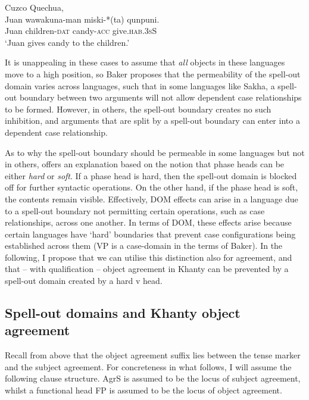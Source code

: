 \documentclass[output=paper
,modfonts
,nonflat]{langsci/langscibook}
\begin{document}
\begin{exe}
\ex Cuzco Quechua, \citet[][146]{Baker2015}\\
\gll Juan wawakuna-man miski-*(ta) qunpuni.\\
Juan children-\textsc{dat} candy-\textsc{acc} give.\textsc{hab.3sS}\\
\glt `Juan gives candy to the children.'
\end{exe}
 
\noindent It is unappealing in these cases to assume that \emph{all} objects in these languages move to a high position, so Baker proposes that the permeability of the spell-out domain varies across languages, such that in some languages like Sakha, a spell-out boundary between two arguments will not allow dependent case relationships to be formed. 
However, in others, the spell-out boundary creates no such inhibition, and arguments that are split by a spell-out boundary can enter into a dependent case relationship. 

As to why the spell-out boundary should be permeable in some languages but not in others, \citeauthor{Baker2015} offers an explanation based on the notion that phase heads can be either \emph{hard} or \emph{soft}. 
If a phase head is hard, then the spell-out domain is blocked off for further syntactic operations. 
On the other hand, if the phase head is soft, the contents remain visible. 
Effectively, DOM effects can arise in a language due to a spell-out boundary not permitting certain operations, such as case relationships, across one another. 
In terms of DOM, these effects arise because certain languages have `hard' boundaries that prevent case configurations being established across them (VP is a case-domain in the terms of Baker).
In the following, I propose that we can utilise this distinction also for agreement, and that -- with qualification -- object agreement in Khanty can be prevented by a spell-out domain created by a hard v head.


\subsection{Spell-out domains and Khanty object agreement}

Recall from above that the object agreement suffix lies between the tense marker and the subject agreement. For concreteness in what follows, I will assume the following clause structure. AgrS is assumed to be the locus of subject agreement, whilst a functional head FP is assumed to be the locus of object agreement.
\end{document}
